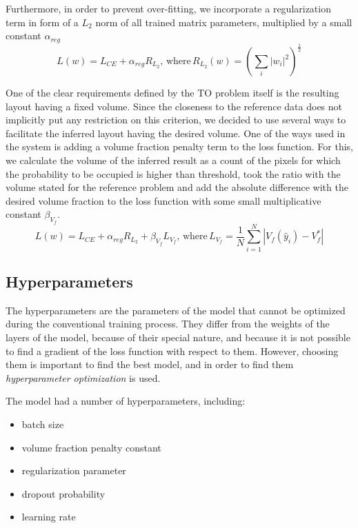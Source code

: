Furthermore, in order to prevent over-fitting, we incorporate a regularization term in form of a $L_{2}$ norm of all trained matrix parameters, multiplied by a small constant $\alpha_{reg}$
\begin{equation}
 	L(w) = L_{CE} + \alpha_{reg} R_{L_{2}}, \, \mathrm{where} \, R_{L_{2}}(w) = ( \sum_{i}^{} |w_{i}|^{2} )^{\frac{1}{2}} 
\end{equation}
\medskip

One of the clear requirements defined by the TO problem itself is the resulting layout having a fixed volume. 
Since the closeness to the reference data does not implicitly put any restriction on this criterion, we decided to use several ways to facilitate the inferred layout having the desired volume.
One of the ways used in the system is adding a volume fraction penalty term to the loss function.
For this, we calculate the volume of the inferred result as a count of the pixels for which the probability to be occupied is higher than threshold, took the ratio with the volume stated for the reference problem and add the absolute difference with the desired volume fraction to the loss function with some small multiplicative constant $\beta_{V_{f}}$.
\begin{equation}
	L(w) = L_{CE} + \alpha_{reg} R_{L_{2}} + \beta_{V_{f}}  L_{V_{f}} , \, \mathrm{where} \, L_{V_{f}} = \frac{1}{N} \sum_{i=1}^{N} |V_{f}(\hat{y}_{i}) - V_{f}^{\ast}|
\end{equation}


\subsection{Hyperparameters}

The hyperparameters are the parameters of the model that cannot be optimized during the conventional training process.
They differ from the weights of the layers of the model, because of their special nature, and because it is not possible to find a gradient of the loss function with respect to them.
However, choosing them is important to find the best model, and in order to find them \emph{hyperparameter optimization} is used.
\medskip

The model had a number of hyperparameters, including:
\begin{itemize}
	\item batch size
	\item volume fraction penalty constant
	\item regularization parameter
	\item dropout probability 
	\item learning rate
\end{itemize}

